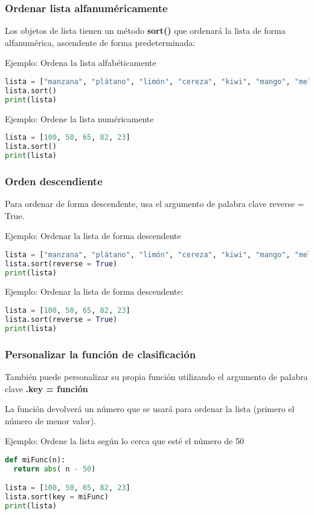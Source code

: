 \begin{frame}[fragile]
  \frametitle{Ordenar lista alfanuméricamente}

  Los objetos de lista tienen un método \textbf{sort()}
  que ordenará la lista de forma alfanumérica, ascendente
  de forma predeterminada:

  \vspace{\baselineskip}
  Ejemplo: Ordena la lista alfabéticamente
  \begin{lstlisting}[language=Python]
lista = ["manzana", "plátano", "limón", "cereza", "kiwi", "mango", "melón"]
lista.sort()
print(lista)
  \end{lstlisting}

  \vspace{\baselineskip}
  Ejemplo: Ordene la lista numéricamente
  \begin{lstlisting}[language=Python]
lista = [100, 50, 65, 82, 23]
lista.sort()
print(lista)
  \end{lstlisting}
\end{frame}

\begin{frame}[fragile]
  \frametitle{Orden descendiente}

  Para ordenar de forma descendente,
  usa el argumento de palabra clave reverse = True.

  \vspace{\baselineskip}
  Ejemplo: Ordenar la lista de forma descendente
  \begin{lstlisting}[language=Python]
lista = ["manzana", "plátano", "limón", "cereza", "kiwi", "mango", "melón"]
lista.sort(reverse = True)
print(lista)
  \end{lstlisting}

  \vspace{\baselineskip}
  Ejemplo: Ordenar la lista de forma descendente:
  \begin{lstlisting}[language=Python]
lista = [100, 50, 65, 82, 23]
lista.sort(reverse = True)
print(lista)
  \end{lstlisting}
\end{frame}

\begin{frame}[fragile]
  \frametitle{Personalizar la función de clasificación}

  También puede personalizar su propia función utilizando el
  argumento de palabra clave \textbf{.key = función}

  \vspace{\baselineskip}
  La función devolverá un número que se usará para ordenar la lista
  (primero el número de menor valor).

  \vspace{\baselineskip}
  Ejemplo: Ordene la lista según lo cerca que esté el número de 50
  \begin{lstlisting}[language=Python]
def miFunc(n):
  return abs( n - 50)

lista = [100, 50, 65, 82, 23]
lista.sort(key = miFunc)
print(lista)
  \end{lstlisting}
\end{frame}


